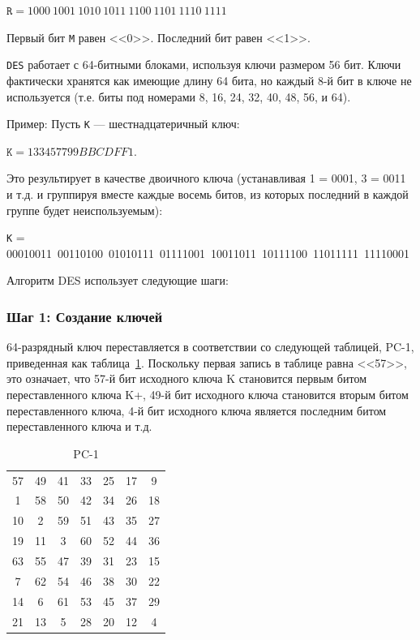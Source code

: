 $\texttt{R} = 1000\ 1001\ 1010\ 1011\ 1100\ 1101\ 1110\ 1111$

Первый бит \texttt{M} равен <<0>>. Последний бит равен <<1>>.

\texttt{DES} работает с 64-битными блоками, используя ключи размером 56 бит. 
Ключи фактически хранятся как имеющие длину 64 бита, но каждый 8-й бит в ключе не используется (т.е. биты под номерами 8, 16, 24, 32, 40, 48, 56, и 64). 

Пример: Пусть \texttt{K} --- шестнадцатеричный ключ:

$\texttt{K} = 133457799BBCDFF1$.

Это результирует в качестве двоичного ключа (устанавливая 1 = 0001, 3 = 0011 и т.д. и группируя вместе каждые восемь битов, из которых последний в каждой группе будет неиспользуемым):

\texttt{K} = 00010011\ 00110100\ 01010111\ 01111001\ 10011011\ 10111100\ 11011111\ 11110001

Алгоритм DES использует следующие шаги:

\subsubsection{Шаг 1: Создание ключей}

64-разрядный ключ переставляется в соответствии со следующей таблицей, PC-1, приведенная как таблица~\ref{tbl:pc-1}. 
Поскольку первая запись в таблице равна <<57>>, это означает, что 57-й бит исходного ключа K становится первым битом переставленного ключа K+,
49-й бит исходного ключа становится вторым битом переставленного ключа,
4-й бит исходного ключа является последним битом переставленного ключа и т.д.

\begin{table}[ht!]
    \begin{center}
		\captionsetup{justification=raggedright,singlelinecheck=off}
		\caption{\label{tbl:pc-1} PC-1}
        \begin{tabular}{ |c c c c c c c|}
                57 &   49  &  41  & 33   & 25  &  17  &  9 \\
                       1  & 58  &  50 &  42 &   34 &   26 &  18 \\
                      10 &   2 &   59 &  51 &   43 &   35 &  27 \\
                      19 &  11 &    3 &  60  &  52  &  44   & 36 \\
                      63  & 55 &   47  & 39  &  31  &  23  & 15 \\
                       7  & 62  &  54  & 46  &  38  &  30  & 22 \\
                      14  &  6  &  61  & 53  &  45  &  37  & 29 \\
                      21  & 13   &  5  & 28  &  20  &  12  &  4
        \end{tabular}
    \end{center}
\end{table}

